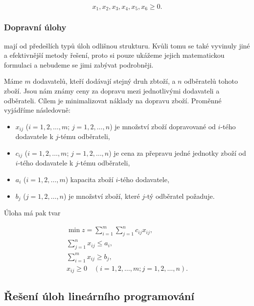 \begin{equation*}
    x_1, x_2, x_3, x_4, x_5, x_6 \geq 0.
\end{equation*}


\subsubsection{Dopravní úlohy} mají od předešlích typů úloh odlišnou strukturu.
Kvůli tomu se také vyvinuly jiné a efektivnější metody řešení, proto si pouze ukážeme jejich matematickou formulaci a nebudeme se jimi zabývat podrobněji.

Máme $m$ dodavatelů, kteří dodávají stejný druh zbtoží, a $n$ odběratelů tohoto zboží.
Jsou nám známy ceny za dopravu mezi jednotlivými dodavateli a odběrateli.
Cílem je minimalizovat náklady na dopravu zboží. Proměnné vyjádříme následovně:

\begin{itemize}[label={}]
    \item $x_{ij}$ ($i = 1, 2, \ldots, m$; $j = 1, 2, \ldots, n$) je množství zboží dopravované od $i$-tého dodavatele k $j$-tému odběrateli,
    \item $c_{ij}$ ($i = 1, 2, \ldots, m$; $j = 1, 2, \ldots, n$) je cena za přepravu jedné jednotky zboží od $i$-tého dodavatele k $j$-tému odběrateli,
    \item $a_i$ ($i = 1, 2, \ldots, m$) kapacita zboží $i$-tého dodavatele,
    \item $b_j$ ($j = 1, 2, \ldots, n$) je množství zboží, které $j$-tý odběratel požaduje.
\end{itemize}

Úloha má pak tvar

\begin{equation}
    \begin{gathered}
        \min z = \sum_{i=1}^{m} \sum_{j=1}^{n} c_{ij}x_{ij}, \\
        \sum_{j=1}^{n} x_{ij} \leq a_i, \\
        \sum_{i=1}^{m} x_{ij} \geq b_j, \\
        x_{ij} \geq 0 \quad (i = 1, 2, \ldots, m; j = 1, 2, \ldots, n).
    \end{gathered}
\end{equation}



\subsection{Řešení úloh lineárního programování}